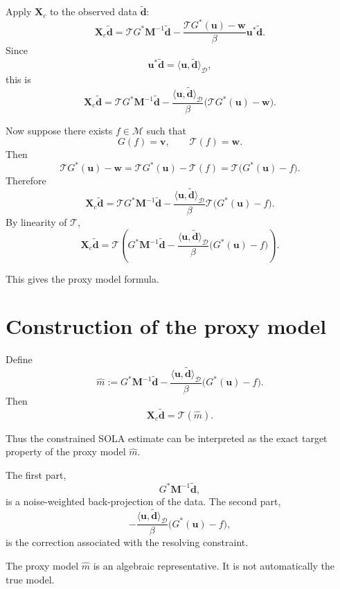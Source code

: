 \documentclass[11pt,openany]{book}
\theoremstyle{definition}
\theoremstyle{remark}
\newcommand{\M}{\mathcal M}
\newcommand{\D}{\mathcal D}
\newcommand{\Tau}{\mathcal{T}}
\begin{document}
Apply \(\mathbf X_c\) to the observed data \(\widetilde{\mathbf d}\):
\[
  \mathbf X_c\widetilde{\mathbf d}
  =
  \Tau G^*\mathbf M^{-1}\widetilde{\mathbf d}
  -
  \frac{\Tau G^*(\mathbf u)-\mathbf w}{\beta}
  \mathbf u^*\widetilde{\mathbf d}.
\]
Since
\[
  \mathbf u^*\widetilde{\mathbf d}
  =
  \langle \mathbf u,\widetilde{\mathbf d}\rangle_{\D},
\]
this is
\[
  \mathbf X_c\widetilde{\mathbf d}
  =
  \Tau G^*\mathbf M^{-1}\widetilde{\mathbf d}
  -
  \frac{\langle \mathbf u,\widetilde{\mathbf d}\rangle_{\D}}{\beta}
  \bigl(\Tau G^*(\mathbf u)-\mathbf w\bigr).
\]

Now suppose there exists \(f\in\M\) such that
\[
  G(f)=\mathbf v,
  \qquad
  \Tau(f)=\mathbf w.
\]
Then
\[
  \Tau G^*(\mathbf u)-\mathbf w
  =
  \Tau G^*(\mathbf u)-\Tau(f)
  =
  \Tau\bigl(G^*(\mathbf u)-f\bigr).
\]
Therefore
\[
  \mathbf X_c\widetilde{\mathbf d}
  =
  \Tau G^*\mathbf M^{-1}\widetilde{\mathbf d}
  -
  \frac{\langle \mathbf u,\widetilde{\mathbf d}\rangle_{\D}}{\beta}
  \Tau\bigl(G^*(\mathbf u)-f\bigr).
\]
By linearity of \(\Tau\),
\[
  \mathbf X_c\widetilde{\mathbf d}
  =
  \Tau\left(
    G^*\mathbf M^{-1}\widetilde{\mathbf d}
    -
    \frac{\langle \mathbf u,\widetilde{\mathbf d}\rangle_{\D}}{\beta}
    \bigl(G^*(\mathbf u)-f\bigr)
  \right).
\]

This gives the proxy model formula.

\section{Construction of the proxy model}

Define
\[
  \hat m
  :=
  G^*\mathbf M^{-1}\widetilde{\mathbf d}
  -
  \frac{\langle \mathbf u,\widetilde{\mathbf d}\rangle_{\D}}{\beta}
  \bigl(G^*(\mathbf u)-f\bigr).
\]
Then
\[
  \boxed{
    \mathbf X_c\widetilde{\mathbf d}=\Tau(\hat m).
  }
\]

Thus the constrained SOLA estimate can be interpreted as the exact target property of the proxy
model \(\hat m\).

The first part,
\[
  G^*\mathbf M^{-1}\widetilde{\mathbf d},
\]
is a noise-weighted back-projection of the data. The second part,
\[
  -
  \frac{\langle \mathbf u,\widetilde{\mathbf d}\rangle_{\D}}{\beta}
  \bigl(G^*(\mathbf u)-f\bigr),
\]
is the correction associated with the resolving constraint.

\begin{warningbox}
The proxy model \(\hat m\) is an algebraic representative. It is not automatically the true
model.
\end{warningbox}
\end{document}

